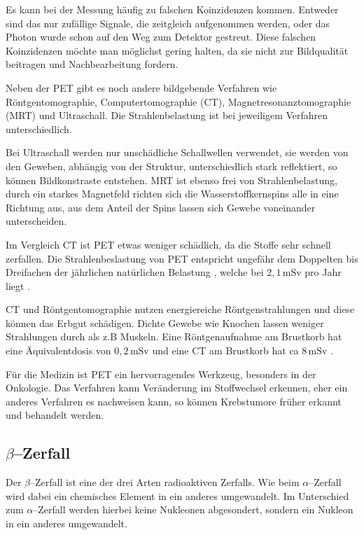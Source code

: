 \documentclass[12pt,a4paper]{scrartcl}
\numberwithin{equation}{section} %
\newcommand{\pu}[1]{\ensuremath{\mathrm{#1}}}
\begin{document}
Es kann bei der Messung häufig zu falschen Koinzidenzen kommen. Entweder sind das nur zufällige Signale, die zeitgleich aufgenommen werden, oder das Photon wurde schon auf den Weg zum Detektor gestreut. Diese falschen Koinzidenzen möchte man möglichst gering halten, da sie nicht zur Bildqualität beitragen und Nachbearbeitung fordern.

Neben der PET gibt es noch andere bildgebende Verfahren wie Röntgentomographie, Computertomographie (CT), Magnetresonanztomographie (MRT) und Ultraschall. Die Strahlenbelastung ist bei jeweiligem Verfahren unterschiedlich.

Bei Ultraschall werden nur unschädliche Schallwellen verwendet, sie werden von den Geweben, abhängig von der Struktur, unterschiedlich stark reflektiert, so können Bildkonstraste entstehen. MRT ist ebenso frei von Strahlenbelastung, durch ein starkes Magnetfeld richten sich die Wasserstoffkernspins alle in eine Richtung aus, aus dem Anteil der Spins lassen sich Gewebe voneinander unterscheiden.

Im Vergleich CT ist PET etwas weniger schädlich, da die Stoffe sehr schnell zerfallen. Die Strahlenbeslastung von PET entspricht ungefähr dem Doppelten bis Dreifachen der jährlichen natürlichen Belastung \cite{DGNM}, welche bei $\pu{2,1 \,mSv}$ pro Jahr liegt \cite{SSK}.

CT und Röntgentomographie nutzen energiereiche Röntgenstrahlungen und diese können das Erbgut schädigen. Dichte Gewebe wie Knochen lassen weniger Strahlungen durch als z.B Muskeln. Eine Röntgenaufnahme am Brustkorb hat eine Äquivalentdosis von $\pu{0,2 \,mSv}$ und eine CT am Brustkorb hat ca $\pu{8 \,mSv}$ \cite{SSK}.

Für die Medizin ist PET ein hervorragendes Werkzeug, besonders in der Onkologie. Das Verfahren kann Veränderung im Stoffwechsel erkennen, eher ein anderes Verfahren es nachweisen kann, so können Krebstumore früher erkannt und behandelt werden.

\hypertarget{betazerfall}{%
\subsection{\texorpdfstring{$\beta$--Zerfall}{\textbackslash beta--Zerfall}}\label{betazerfall}}

Der $\beta$--Zerfall ist eine der drei Arten radioaktiven Zerfalls. Wie beim $\alpha$--Zerfall wird dabei ein chemisches Element in ein anderes umgewandelt. Im Unterschied zum $\alpha$--Zerfall werden hierbei keine Nukleonen abgesondert, sondern ein Nukleon in ein anderes umgewandelt.
\end{document}
